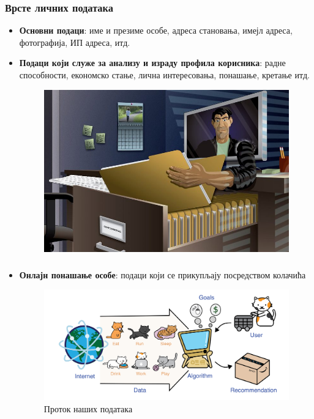 \documentclass{beamer}
\begin{document}
\begin{frame}[fragile]\frametitle{Врсте личних података}
	\begin{itemize}	
		\item \textbf{Основни подаци}:
име и презиме особе, адреса становања, имејл адреса, фотографија, ИП адреса, итд.

 		\item \textbf{Подаци који служе за анализу и израду профила корисника}: радне способности, економско стање, лична интересовања, понашање, кретање итд.
 		\begin{figure}[h!]
\begin{center}
\includegraphics[scale=0.2]{slika.jpg}
\end{center}
\end{figure}
	\end{itemize}
\end{frame}

\begin{frame}[fragile]\frametitle{}
	\begin{itemize}	
		\item \textbf{Онлајн понашање особе}: подаци који се прикупљају посредством колачића 
		
\begin{figure}[h!]
\begin{center}
\includegraphics[scale=0.075]{slika2.jpg}
\caption{Проток наших података}
\end{center}
\end{figure}
		
	\end{itemize}
\end{frame}
\end{document}
